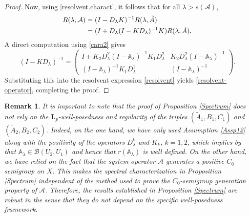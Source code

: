 \documentclass[a4paper,11pt,reqno]{amsart}
\def\la{\lambda}
\def\calA{{\mathcal{A}}}
\theoremstyle{plain}
\newtheorem{remark}{Remark}[section]
\numberwithin{equation}{section}
\begin{document}
\begin{proof}
Now, using \eqref{resolvent.charact}, it follows that for all $\lambda>s(\mathcal{A})$,
\begin{align}
R(\la, \calA)&= (I-D_\lambda K)^{-1} R(\la ,\tilde{A})\notag\\
&=(I+{D}_\la (I-KD_\la)^{-1}{K})R(\la ,\tilde{{A}}).\label{resolvent}
\end{align}
A direct computation using \eqref{cara2} gives
\begin{equation*}
(I-K D_\la )^{-1}=\left(\begin{matrix}
I+ K_2 D_\la^2\left(I-\mathbb{A}_\la\right)^{-1}K_1 D_\la^2& K_2 D_\la^2\left(I-\mathbb{A}_\la\right)^{-1}\\
\left(I-\mathbb{A}_\la\right)^{-1}K_1 D_\la^1& \left(I-\mathbb{A}_\la\right)^{-1}
\end{matrix}\right).
\end{equation*}
Substituting this into the resolvent expression \eqref{resolvent} yields \eqref{resolvent-operator}, completing the proof.
\end{proof}

\begin{remark}
It is important to note that the proof of Proposition \ref{Spectrum} does not rely on the $\bm{L}_p$-well-posedness and regularity of the triples $(\tilde{A}_1,B_1,C_1)$ and $(\tilde{A}_2,B_2,C_2)$. Indeed, on the one hand, we have only used Assumption \ref{Assp12} along with the positivity of the operators $D_\lambda^k$ and $K_k$, $k=1,2$, which implies by \cite[Theorem II.5.3]{MR423039} that $\mathbb{A}_\lambda \in \mathcal{B}(U_2,U_1)$ and hence that $r(\mathbb{A}_\lambda)$ is well defined. On the other hand, we have relied on the fact that the system operator $\mathcal{A}$ generates a positive $C_0$-semigroup on $X$. This makes the spectral characterization in Proposition \ref{Spectrum} independent of the method used to prove the $C_0$-semigroup generation property of $\mathcal{A}$. Therefore, the results established in Proposition \ref{Spectrum} are robust in the sense that they do not depend on the specific well-posedness framework.
\end{remark}
\end{document}
